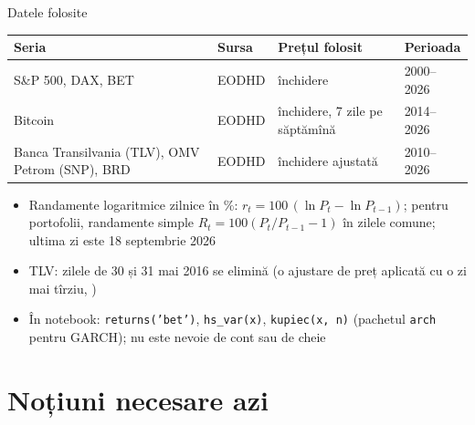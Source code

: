 \begin{frame}{Datele folosite}
\itemsize{\small}
\begin{center}
\footnotesize
\begin{tabular}{llll}
\toprule
\textbf{Seria} & \textbf{Sursa} & \textbf{Prețul folosit} & \textbf{Perioada} \\
\midrule
S\&P 500, DAX, BET & EODHD & închidere & 2000--2026 \\
Bitcoin & EODHD & închidere, 7 zile pe săptămînă & 2014--2026 \\
Banca Transilvania (TLV), OMV Petrom (SNP), BRD & EODHD & închidere ajustată & 2010--2026 \\
\bottomrule
\end{tabular}
\end{center}
\begin{itemize}
    \item Randamente logaritmice zilnice în \%: $r_t = 100\,(\ln P_t - \ln P_{t-1})$; pentru portofolii, randamente simple $R_t = 100(P_t/P_{t-1} - 1)$ în zilele comune; ultima zi este 18 septembrie 2026
    \item TLV: zilele de 30 și 31 mai 2016 se elimină (o ajustare de preț aplicată cu o zi mai tîrziu, )
    \item În notebook: \texttt{returns('bet')}, \texttt{hs\_var(x)}, \texttt{kupiec(x, n)} (pachetul \texttt{arch} pentru GARCH); nu este nevoie de cont sau de cheie
\end{itemize}
\end{frame}


\section{Noțiuni necesare azi}

